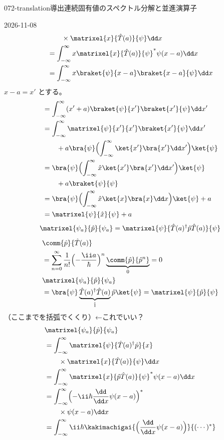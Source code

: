 \documentclass[uplatex,dvipdfmx,a4paper,11pt]{jsarticle}
\begin{document}
\begin{mondai}{072-translation}{導出}{連続固有値のスペクトル分解と並進演算子}
\begin{kotaeutsushi}{2026-11-08}
\begin{align*}
&\qquad\times\matrixel{x}{\hat{T}(a)}{\psi}\dd x\\
&=\int_{-\infty}^{\infty}x\matrixel{x}{\hat{T}(a)}{\psi}^{*}\psi(x-a)\dd x\\
&=\int_{-\infty}^{\infty}x\braket{\psi}{x-a}\braket{x-a}{\psi}\dd x
\end{align*}
$x-a=x'$ とする。
\begin{align*}
&=\int_{-\infty}^{\infty}(x'+a)\braket{\psi}{x'}\braket{x'}{\psi}\dd x'\\
&=\int_{-\infty}^{\infty}\matrixel{\psi}{x'}{x'}\braket{x'}{\psi}\dd x'\\
&\qquad+a\bra{\psi}\Bigl(\int_{-\infty}^{\infty}\ket{x'}\bra{x'}\dd x'\Bigr)\ket{\psi}\\
&=\bra{\psi}\Bigl(\int_{-\infty}^{\infty}\hat{x}\ket{x'}\bra{x'}\dd x'\Bigr)\ket{\psi}\\
&\qquad+a\braket{\psi}{\psi}\\
&=\bra{\psi}\Bigl(\int_{-\infty}^{\infty}\hat{x}\ket{x}\bra{x}\dd x\Bigr)\ket{\psi}+a\\
&=\matrixel{\psi}{\hat{x}}{\psi}+a
\end{align*}
\[ \matrixel{\psi_{a}}{\hat{p}}{\psi_{a}}=\matrixel{\psi}{\hat{T}(a)^{\dagger}\hat{p}\hat{T}(a)}{\psi} \]
\begin{align*}
&\comm{\hat{p}}{\hat{T}(a)}\\
&=\sum_{n=0}^{\infty}\frac{1}{n!}\Bigl(-\frac{\ii a}{\hbar}\Bigr)^{n}\underbrace{\comm{\hat{p}}{\hat{p}^{n}}}_{0}=0\\
&\matrixel{\psi_{a}}{\hat{p}}{\psi_{a}}\\
&=\bra{\psi}\underbrace{\hat{T}(a)^{\dagger}\hat{T}(a)}_{\hat{1}}\hat{p}\ket{\psi}=\matrixel{\psi}{\hat{p}}{\psi}
\end{align*}
（ここまでを括弧でくくり）←これでいい？
\begin{align*}
&\matrixel{\psi_{a}}{\hat{p}}{\psi_{a}}\\
&=\int_{-\infty}^{\infty}\matrixel{\psi}{\hat{T}(a)^{\dagger}\hat{p}}{x}\\
&\qquad\times\matrixel{x}{\hat{T}(a)}{\psi}\dd x\\
&=\int_{-\infty}^{\infty}\matrixel{x}{\hat{p}\hat{T}(a)}{\psi}^{*}\psi(x-a)\dd x\\
&=\int_{-\infty}^{\infty}\Bigl(-\ii\hbar\frac{\dd}{\dd x}\psi(x-a)\Bigr)^{*}\\
&\qquad\times\psi(x-a)\dd x\\
&=\int_{-\infty}^{\infty}\ii\hbar\kakimachigai{\Bigl(\frac{\dd}{\dd x}\psi(x-a)\Bigr)}{(\cdots)^{*}}\\

\end{align*}
\end{kotaeutsushi}
\end{mondai}
\end{document}
